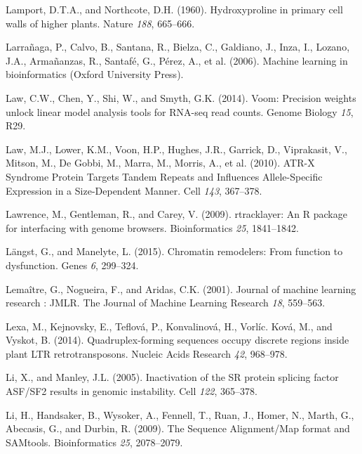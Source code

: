 \documentclass[12pt,a4paper,]{report}
\begin{document}
\leavevmode\hypertarget{ref-Lamport1960}{}%
Lamport, D.T.A., and Northcote, D.H. (1960). Hydroxyproline in primary
cell walls of higher plants. Nature \emph{188}, 665--666.

\leavevmode\hypertarget{ref-Larranaga2006}{}%
Larrañaga, P., Calvo, B., Santana, R., Bielza, C., Galdiano, J., Inza,
I., Lozano, J.A., Armañanzas, R., Santafé, G., Pérez, A., et al. (2006).
Machine learning in bioinformatics (Oxford University Press).

\leavevmode\hypertarget{ref-Law2014}{}%
Law, C.W., Chen, Y., Shi, W., and Smyth, G.K. (2014). Voom: Precision
weights unlock linear model analysis tools for RNA-seq read counts.
Genome Biology \emph{15}, R29.

\leavevmode\hypertarget{ref-Law2010}{}%
Law, M.J., Lower, K.M., Voon, H.P., Hughes, J.R., Garrick, D.,
Viprakasit, V., Mitson, M., De Gobbi, M., Marra, M., Morris, A., et al.
(2010). ATR-X Syndrome Protein Targets Tandem Repeats and Influences
Allele-Specific Expression in a Size-Dependent Manner. Cell \emph{143},
367--378.

\leavevmode\hypertarget{ref-Lawrence2009}{}%
Lawrence, M., Gentleman, R., and Carey, V. (2009). rtracklayer: An R
package for interfacing with genome browsers. Bioinformatics \emph{25},
1841--1842.

\leavevmode\hypertarget{ref-Langst2015}{}%
Längst, G., and Manelyte, L. (2015). Chromatin remodelers: From function
to dysfunction. Genes \emph{6}, 299--324.

\leavevmode\hypertarget{ref-Lemaitre2001}{}%
Lemaître, G., Nogueira, F., and Aridas, C.K. (2001). Journal of machine
learning research : JMLR. The Journal of Machine Learning Research
\emph{18}, 559--563.

\leavevmode\hypertarget{ref-Lexa2014}{}%
Lexa, M., Kejnovsky, E., Teflová, P., Konvalinová, H., Vorlíc. Ková, M.,
and Vyskot, B. (2014). Quadruplex-forming sequences occupy discrete
regions inside plant LTR retrotransposons. Nucleic Acids Research
\emph{42}, 968--978.

\leavevmode\hypertarget{ref-Li2005}{}%
Li, X., and Manley, J.L. (2005). Inactivation of the SR protein splicing
factor ASF/SF2 results in genomic instability. Cell \emph{122},
365--378.

\leavevmode\hypertarget{ref-Li2009}{}%
Li, H., Handsaker, B., Wysoker, A., Fennell, T., Ruan, J., Homer, N.,
Marth, G., Abecasis, G., and Durbin, R. (2009). The Sequence
Alignment/Map format and SAMtools. Bioinformatics \emph{25}, 2078--2079.
\end{document}
